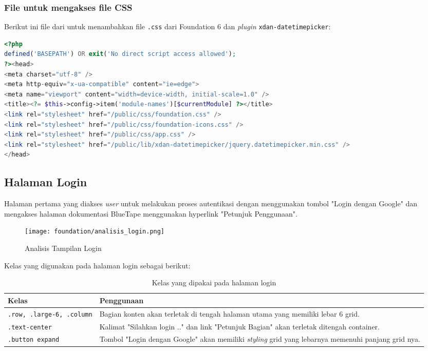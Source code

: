\subsubsection{File untuk mengakses file CSS}
\noindent Berikut ini file dari  untuk menambahkan file \texttt{.css} dari Foundation 6 dan \textit{plugin} \texttt{xdan-datetimepicker}:
\begin{lstlisting}[language=PHP, caption=Penambahan library css, label=Entri, basicstyle=\footnotesize\ttfamily, frame=single,
columns=fullflexible, keepspaces=true, breaklines=true, showstringspaces=false]
<?php
defined('BASEPATH') OR exit('No direct script access allowed');
?><head>
<meta charset="utf-8" />
<meta http-equiv="x-ua-compatible" content="ie=edge">
<meta name="viewport" content="width=device-width, initial-scale=1.0" />
<title><?= $this->config->item('module-names')[$currentModule] ?></title>
<link rel="stylesheet" href="/public/css/foundation.css" />
<link rel="stylesheet" href="/public/css/foundation-icons.css" />
<link rel="stylesheet" href="/public/css/app.css" />
<link rel="stylesheet" href="/public/lib/xdan-datetimepicker/jquery.datetimepicker.min.css" />
</head>
\end{lstlisting}

\subsection{Halaman Login}

\noindent Halaman pertama yang diakses \textit{user} untuk melakukan proses autentikasi dengan menggunakan tombol "Login dengan Google" dan mengakses halaman dokumentasi BlueTape menggunakan hyperlink "Petunjuk Penggunaan".

\begin{figure} [H]
	\centering  
	\texttt{[image: foundation/analisis\_login.png]} 
	\caption{Analisis Tampilan Login} 
\end{figure} 

Kelas yang digunakan pada halaman login sebagai berikut:\\

\begin{table}[H]
	\centering
	\begin{tabularx}{\textwidth}{lX}
		\toprule
		Kelas     & Penggunaan \\
		\midrule
		\texttt{.row, .large-6, .column} & Bagian konten akan terletak di tengah halaman utama yang memiliki lebar 6 grid.  \\
 		\texttt{.text-center} & Kalimat "Silahkan login .." dan link "Petunjuk Bagian" akan terletak ditengah container.\\
		\texttt{.button expand} & Tombol "Login dengan Google" akan memiliki \textit{styling} grid yang lebarnya memenuhi panjang grid nya.\\
		\bottomrule
	\end{tabularx}%
	\caption{Kelas yang dipakai pada halaman login}
\end{table} \noindent \\

